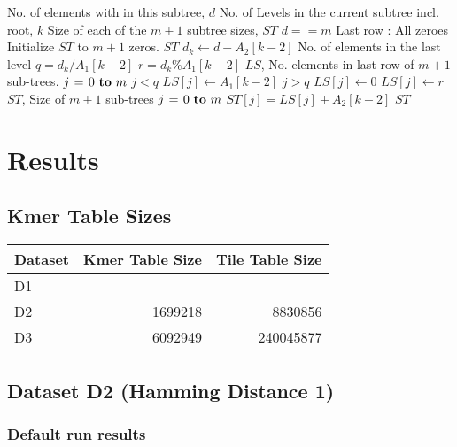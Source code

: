 \documentclass[integrals, nointegrals, article, 12pt, a4paper]{article}
\begin{document}
\begin{codebox}
\zi {} No. of elements with in this subtree, $d$
\zi {} No. of Levels in the current subtree incl. root, $k$
\zi {} Size of each of the $m+1$ subtree sizes, $ST$
\li \If $d == m$ \Comment Last row : All zeroes
\li \Do Initialize $ST$ to $m+1$ zeros.
\li     \Return $ST$ \End
\li $d_k \gets d - A_2[k - 2]$ \Comment No. of elements in the last level
\li $q = d_k / A_1[k - 2]$
\li $r = d_k \% A_1[k - 2]$
\zi \Comment $LS$, No. elements in last row of $m+1$ sub-trees.
\li \For $j \gets 0 \To m$
\li \Do \If $j < q$
\li        \Then $LS[j] \gets A_1[k - 2]$
\li      \ElseIf $j > q$
\li        \Then $LS[j] \gets 0$
\li      \Else
\li         $LS[j] \gets r$ \End
    \End
\zi \Comment $ST$, Size of $m+1$ sub-trees
\li \For $j \gets 0 \To m$
\li \Do $ST[j] = LS[j] + A_2[k-2]$ \End
\li \Return $ST$
\end{codebox}

\section{Results}
\label{sec-2}
\subsection{Kmer Table Sizes}
\label{sec-2-1}
\begin{center}
\begin{tabular}{lrr}
\hline
Dataset & Kmer Table Size & Tile Table Size\\
\hline
D1 &  & \\
D2 & 1699218 & 8830856\\
D3 & 6092949 & 240045877\\
\hline
\end{tabular}
\end{center}
\subsection{Dataset D2 (Hamming Distance 1)}
\label{sec-2-2}
\subsubsection{Default run results}
\label{sec-2-2-1}
\end{document}

